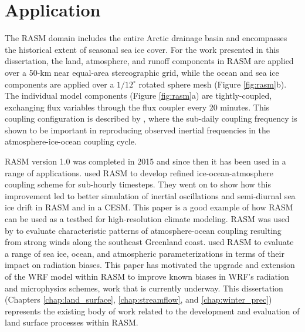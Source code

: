 \section{Application}

The RASM domain includes the entire Arctic drainage basin and encompasses the historical extent of seasonal sea ice cover.
For the work presented in this dissertation, the land, atmosphere, and runoff components in RASM are applied over a 50-km near equal-area stereographic grid, while the ocean and sea ice components are applied over a $1/12^{\circ}$ rotated sphere mesh (Figure \ref{fig:rasm}b).
The individual model components (Figure \ref{fig:rasm}a) are tightly-coupled, exchanging flux variables through the flux coupler every 20 minutes.
This coupling configuration is described by \citet{Roberts_2015a}, where the sub-daily coupling frequency is shown to be important in reproducing observed inertial frequencies in the atmosphere-ice-ocean coupling cycle.

RASM version 1.0 was completed in 2015 and since then it has been used in a range of applications.
\citet{Roberts_2015a} used RASM to develop refined ice-ocean-atmosphere coupling scheme for sub-hourly timesteps.
They went on to show how this improvement led to better simulation of inertial oscillations and semi-diurnal sea ice drift in RASM and in a CESM.
This paper is a good example of how RASM can be used as a testbed for high-resolution climate modeling.
RASM was used by \citet{DuVivier_2016} to evaluate characteristic patterns of atmosphere-ocean coupling resulting from strong winds along the southeast Greenland coast.
\citet{Cassano_2016} used RASM to evaluate a range of sea ice, ocean, and atmospheric parameterizations in terms of their impact on radiation biases.
This paper has motivated the upgrade and extension of the WRF model within RASM to improve known biases in WRF's radiation and microphysics schemes, work that is currently underway.
This dissertation (Chapters \ref{chap:land_surface}, \ref{chap:streamflow}, and \ref{chap:winter_prec}) represents the existing body of work related to the development and evaluation of land surface processes within RASM.
